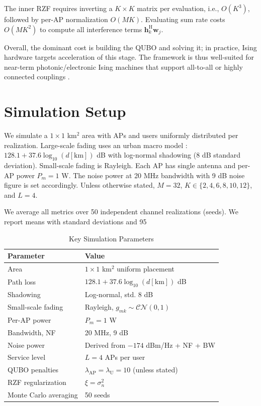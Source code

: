 {The inner RZF requires inverting a $K\times K$ matrix per evaluation, i.e., $O(K^3)$, followed by per-AP normalization $O(MK)$. Evaluating sum rate costs $O(MK^2)$ to compute all interference terms $\mathbf{h}_k^\mathrm{H}\mathbf{w}_j$.

Overall, the dominant cost is building the QUBO and solving it; in practice, Ising hardware targets acceleration of this stage. The framework is thus well-suited for near-term photonic/electronic Ising machines that support all-to-all or highly connected couplings \cite{mcmahon2016fully,inagaki2016coherent}.

\section{Simulation Setup}
We simulate a $1\times 1$ km$^2$ area with APs and users uniformly distributed per realization. Large-scale fading uses an urban macro model \cite{bjornson2016massive}: $128.1+37.6\log_{10}(d[\mathrm{km}])$ dB with log-normal shadowing (8 dB standard deviation). Small-scale fading is Rayleigh. Each AP has single antenna and per-AP power $P_m=1$ W. The noise power at 20 MHz bandwidth with 9 dB noise figure is set accordingly. Unless otherwise stated, $M=32$, $K\in\{2,4,6,8,10,12\}$, and $L=4$.

We average all metrics over 50 independent channel realizations (seeds). We report means with standard deviations and 95%

\begin{table}[htbp]
\caption{Key Simulation Parameters}
\centering
\small
\begin{tabular}{@{}ll@{}}
\toprule
Parameter & Value \\ \midrule
Area & $1\times 1$ km$^2$ uniform placement \\
Path loss & $128.1+37.6\log_{10}(d[\mathrm{km}])$ dB \\
Shadowing & Log-normal, std. 8 dB \\
Small-scale fading & Rayleigh, $g_{mk}\sim\mathcal{CN}(0,1)$ \\
Per-AP power & $P_m=1$ W \\
Bandwidth, NF & 20 MHz, 9 dB \\
Noise power & Derived from $-174$ dBm/Hz + NF + BW \\
Service level & $L=4$ APs per user \\
QUBO penalties & $\lambda_{\text{AP}}=\lambda_{\text{U}}=10$ (unless stated) \\
RZF regularization & $\xi=\sigma_n^2$ \\
Monte Carlo averaging & 50 seeds \\
\bottomrule
\end{tabular}
\end{table}

}
